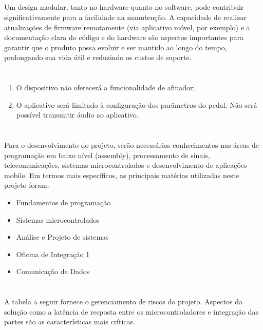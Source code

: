 \subsection{}

Um design modular, tanto no hardware quanto no software, pode contribuir significativamente para a facilidade na manutenção. A capacidade de realizar atualizações de firmware remotamente (via aplicativo móvel, por exemplo) e a documentação clara do código e do hardware são aspectos importantes para garantir que o produto possa evoluir e ser mantido ao longo do tempo, prolongando sua vida útil e reduzindo os custos de suporte.


\section{}
\begin{enumerate}
    \item O dispositivo não oferecerá a funcionalidade de afinador;
    \item O aplicativo será limitado à configuração dos parâmetros do pedal. Não será possível transmitir áudio ao aplicativo.
\end{enumerate}

\section{}
Para o desenvolvimento do projeto, serão necessários conhecimentos nas áreas de programação em baixo nível (assembly), processamento de sinais, telecomunicações, sistemas microcontrolados e desenvolvimento de aplicações mobile. Em termos mais específicos, as principais matérias utilizadas neste projeto foram:

\begin{itemize}
  \item Fundamentos de programação
  \item Sistemas microcontrolados
  \item Análise e Projeto de sistemas
  \item Oficina de Integração 1
  \item Comunicação de Dados
\end{itemize}

\section{}
A tabela a seguir fornece o gerenciamento de riscos do projeto. Aspectos da solução como a latência de resposta entre os microcontroladores e integração das partes são as características mais críticas.

